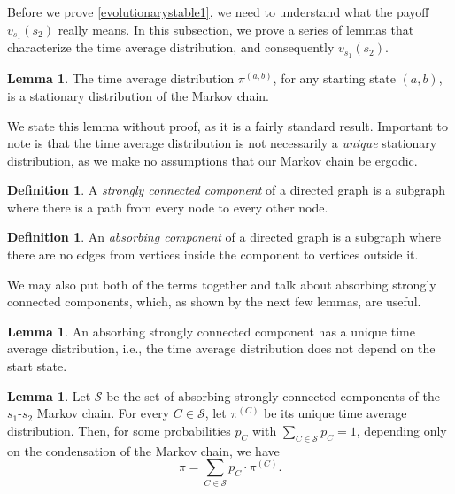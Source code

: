 \documentclass[11pt]{amsart}
\theoremstyle{definition}
\newtheorem{definition}[theorem]{Definition}
\newtheorem{lemma}[theorem]{Lemma}
\theoremstyle{remark}
\begin{document}
Before we prove \cref{evolutionarystable1}, we need to understand what the payoff $v_{s_1}(s_2)$ really means. In this subsection, we prove a series of lemmas that characterize the time average distribution, and consequently $v_{s_1}(s_2)$.

\begin{lemma}
  \label{timeaverageisstationary}
  The time average distribution $\pi^{(a,b)}$, for any starting state $(a,b)$, is a stationary distribution of the Markov chain.
\end{lemma}

We state this lemma without proof, as it is a fairly standard result. Important to note is that the time average distribution is not necessarily a \textit{unique} stationary distribution, as we make no assumptions that our Markov chain be ergodic.

\begin{definition}
  A \textit{strongly connected component} of a directed graph is a subgraph where there is a path from every node to every other node.
\end{definition}

\begin{definition}
  An \textit{absorbing component} of a directed graph is a subgraph where there are no edges from vertices inside the component to vertices outside it.
\end{definition}

We may also put both of the terms together and talk about absorbing strongly connected components, which, as shown by the next few lemmas, are useful.

\begin{lemma}
  An absorbing strongly connected component has a unique time average distribution, i.e., the time average distribution does not depend on the start state.
\end{lemma}

\begin{lemma}
  \label{timeaveragedistributiondecomposition}
  Let $\mathcal{S}$ be the set of absorbing strongly connected components of the $s_1$-$s_2$ Markov chain. For every $C \in \mathcal{S}$, let $\pi^{(C)}$ be its unique time average distribution. Then, for some probabilities $p_C$ with $\sum_{C \in \mathcal{S}} p_C = 1$, depending only on the condensation of the Markov chain, we have \begin{equation*}
    \pi = \sum_{C \in \mathcal{S}} p_C \cdot \pi^{(C)}.
  \end{equation*}
\end{lemma}
\end{document}

